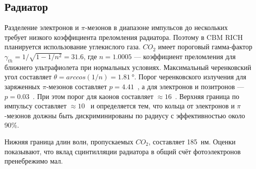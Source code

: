 %                                         

\subsection{Радиатор}\label{sec:CbmRichRadiator}


Разделение электронов и $\pi$-мезонов в диапазоне импульсов до нескольких~\GeVoverC{} требует низкого коэффициента преломления радиатора. Поэтому в CBM RICH планируется использование углекислого газа.
$CO_{2}$ имеет пороговый гамма-фактор $\gamma _{th} = 1 / \sqrt{1 - 1/n^{2}} = 31.6$, где $n = 1.0005$ --- коэффициент преломления для ближнего ультрафиолета при нормальных условиях. Максимальный черенковский угол составляет $\theta = arccos(1/n) = \SI{1.81}{\degree}$. Порог черенковского излучения для заряженных $\pi$-мезонов составляет $p = 4.41$~\GeVoverC{}, а для электронов и позитронов --- $p = 0.03$~\GeVoverC{}. При этом порог для каонов составляет $\approx 16$~\GeVoverC{}. Верхняя граница по импульсу составляет $\approx 10$~\GeVoverC{} и определяется тем, что кольца от электронов и $\pi$-мезонов должны быть дискриминированы по радиусу с эффективностью около 90\%.

Нижняя граница длин волн, пропускаемых $CO_{2}$, составляет 185~нм. Оценки показывают, что вклад сцинтилляции радиатора в общий счёт фотоэлектронов пренебрежимо мал.



